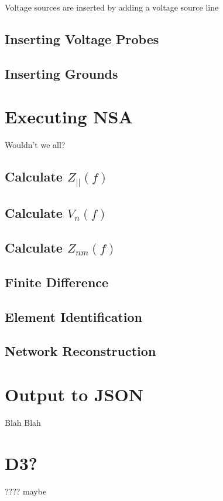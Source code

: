 \documentclass[11pt,twoside]{mitthesis}
\begin{document}
Voltage sources are inserted by adding a voltage source line 
\subsection{Inserting Voltage Probes}
\subsection{Inserting Grounds}

\section{Executing NSA}
Wouldn't we all?
\subsection{Calculate $Z_{||}(f)$}
\subsection{Calculate $V_n(f)$}
\subsection{Calculate $Z_{nm}(f)$}
\subsection{Finite Difference}
\subsection{Element Identification}
\subsection{Network Reconstruction}

\section{Output to JSON}
Blah Blah

\section{D3?}
???? maybe
\end{document}
